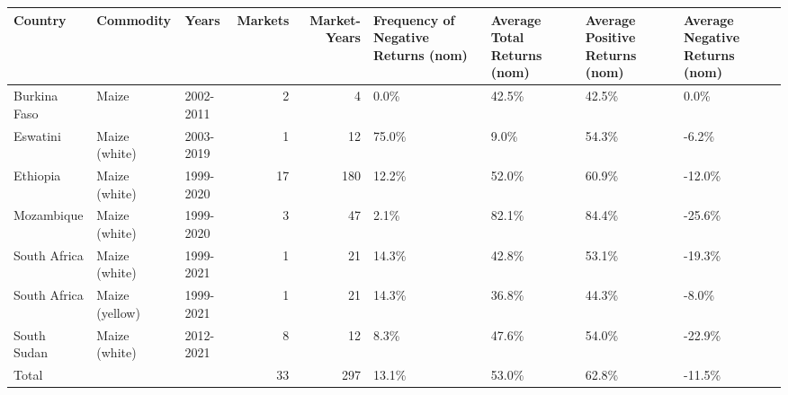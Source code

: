 \begin{table}[ht]
\centering
\begin{tabular}{lllrrllll}
  \hline
Country & Commodity & Years & Markets & Market-Years & Frequency of Negative Returns (nom) & Average Total Returns (nom) & Average Positive Returns (nom) & Average Negative Returns (nom) \\ 
  \hline
Burkina Faso & Maize & 2002-2011 &   2 &   4 & 0.0\% & 42.5\% & 42.5\% & 0.0\% \\ 
  Eswatini & Maize (white) & 2003-2019 &   1 &  12 & 75.0\% & 9.0\% & 54.3\% & -6.2\% \\ 
  Ethiopia & Maize (white) & 1999-2020 &  17 & 180 & 12.2\% & 52.0\% & 60.9\% & -12.0\% \\ 
  Mozambique & Maize (white) & 1999-2020 &   3 &  47 & 2.1\% & 82.1\% & 84.4\% & -25.6\% \\ 
  South Africa & Maize (white) & 1999-2021 &   1 &  21 & 14.3\% & 42.8\% & 53.1\% & -19.3\% \\ 
  South Africa & Maize (yellow) & 1999-2021 &   1 &  21 & 14.3\% & 36.8\% & 44.3\% & -8.0\% \\ 
  South Sudan & Maize (white) & 2012-2021 &   8 &  12 & 8.3\% & 47.6\% & 54.0\% & -22.9\% \\ 
  Total &  &  &  33 & 297 & 13.1\% & 53.0\% & 62.8\% & -11.5\% \\ 
   \hline
\end{tabular}
\end{table}
